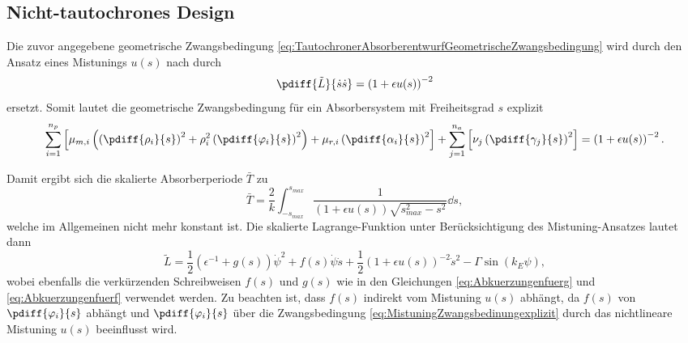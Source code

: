 \subsection{Nicht-tautochrones Design}
%
%
%
%
Die zuvor angegebene geometrische Zwangsbedingung \eqref{eq:TautochronerAbsorberentwurfGeometrischeZwangsbedingung} wird durch den Ansatz eines Mistunings $u(s)$ nach \cite{Mayet:CPVAMitMistuning} durch 
\begin{equation}
		\pdiff{\tilde{L}}{{\dot{s}}{\dot{s}}} = \left( 1 + \epsilon u(s) \right)^{-2}
		\label{eq:GeometrischeZwangsbedingungMitMistuning}
\end{equation}
ersetzt. Somit lautet die geometrische Zwangsbedingung für ein Absorbersystem mit Freiheitsgrad $s$ explizit
\begin{equation}
		\sum^{n_p}_{i=1}    {   \left[    \mu_{m,i} \left( \left(\pdiff{\rho_i}{s}\right)^2 +  \rho_i^2 \left(\pdiff{\varphi_i}{s}\right)^2  \right)  + \mu_{r,i} \left(\pdiff{\alpha_i}{s}\right)^2  \right]  } 
		+ \sum^{n_a}_{j=1}   {\left[ \nu_j \left( \pdiff{\gamma_j}{s} \right)^2  \right]}  =   \left( 1 + \epsilon u(s) \right)^{-2}.
		\label{eq:MistuningZwangsbedinungexplizit}
\end{equation}
%
%
%
% 

Damit ergibt sich die skalierte Absorberperiode $\bar{T}$ zu 
\begin{equation}
		\bar{T} =  \frac{2}{k} \int_{-s_{max}}^{s_{max}} {\frac{ 1}{ \left(1+\epsilon u(s) \right) \sqrt{s_{max}^2 - s^2}}\dd s} ,
		\label{eq:PeriodendauerAbsorberMitMistuning}
\end{equation}   
welche im Allgemeinen nicht mehr konstant ist.
%
%
%
% 
Die skalierte Lagrange-Funktion unter Berücksichtigung des Mistuning-Ansatzes lautet dann
\begin{equation}
	\tilde{L} = \frac{1}{2} \left(\epsilon^{-1} + g(s) \right)\dot{\psi}^2 + f(s) \dot{\psi} \dot{s} + \frac{1}{2}  {\left( 1 + \epsilon u(s) \right)^{-2}} \dot{s}^2 - \Gamma \sin\left( k_E \psi \right),
	\label{eq:SkalierteLagrangeFunktionfuereinAbsorbersystemMitfUndgMitMistuning}
\end{equation}
wobei ebenfalls die verkürzenden Schreibweisen  $f(s)$ und $g(s)$ wie in 
den Gleichungen \eqref{eq:Abkuerzungenfuerg} und \eqref{eq:Abkuerzungenfuerf} verwendet werden. 
Zu beachten ist, dass $f(s)$ indirekt vom Mistuning $u(s)$ abhängt, da $f(s)$ von $\pdiff{\varphi_i}{s}$ abhängt 
und $\pdiff{\varphi_i}{s}$ über die Zwangsbedingung	\eqref{eq:MistuningZwangsbedinungexplizit} durch  das nichtlineare Mistuning $u(s)$ beeinflusst wird.


